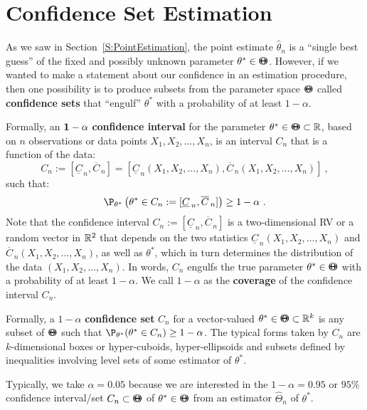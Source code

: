 \section{Confidence Set Estimation}\label{S:ConfidenceSets}
As we saw in Section~\ref*{S:PointEstimation}, the point estimate $\widehat{\theta}_n$ is a ``single best guess'' of  the fixed and possibly unknown parameter $\theta^* \in {\Theta}\mspace{-11 mu}{\Theta}$.  However, if we wanted to make a statement about our confidence in an estimation procedure, then one possibility is to produce subsets from the parameter space ${\Theta}\mspace{-11 mu}{\Theta}$ called {\bf confidence sets} that ``engulf'' $\theta^*$ with a probability of at least $1-\alpha$.  

Formally, an $\mathbf{1-\alpha}$ {\bf confidence interval} for the parameter $\theta^* \in {\Theta}\mspace{-11 mu}{\Theta} \subset \mathbb{R}$, based on $n$ observations or data points $X_1,X_2,\ldots,X_n$, is an interval $C_n$ that is a function of the data:
\[
C_n := [\underline{C}_{\, n}, \overline{C}_{\, n}]
= [\underline{C}_{\, n}(X_1,X_2,\ldots,X_n), \overline{C}_{\, n}(X_1,X_2,\ldots,X_n)] \ ,
\]
such that:
\[
\P_{\theta^*} \left(  \theta^* \in C_n :=  [\underline{C}_{\, n}, \overline{C}_{\, n}] \right) \geq 1-\alpha \ .
\]
Note that the confidence interval $C_n := [\underline{C}_{\, n}, \overline{C}_{\, n}]$ is a two-dimensional RV or a random vector in $\mathbb{R}^2$ that depends on the two statistics $\underline{C}_{\, n} (X_1,X_2,\ldots,X_n) $ and $\overline{C}_{\, n} (X_1,X_2,\ldots,X_n) $, as well as $\theta^*$, which in turn determines the distribution of the data $(X_1,X_2,\ldots,X_n)$.  In words, $C_n$ engulfs the true parameter $\theta^* \in {\Theta}\mspace{-11 mu}{\Theta}$ with a probability of at least $1-\alpha$.  We call $1-\alpha$ as the {\bf coverage} of the confidence interval $C_n$.

Formally, a $1-\alpha$ {\bf confidence set} $C_n$ for a vector-valued $\theta^* \in {\Theta}\mspace{-11 mu}{\Theta} \subset \mathbb{R}^k$ is any subset of ${\Theta}\mspace{-11 mu}{\Theta}$ such that $\P_{\theta^*}( \theta^* \in C_n) \geq 1-\alpha$.  The typical forms taken by $C_n$ are $k$-dimensional boxes or hyper-cuboids, hyper-ellipsoids and subsets defined by inequalities involving level sets of some estimator of $\theta^*$.  

Typically, we take $\alpha=0.05$ because we are interested in the $1-\alpha=0.95$ or $95\%$ confidence interval/set $C_n \subset {\Theta}\mspace{-11 mu}{\Theta}$ of $\theta^* \in {\Theta}\mspace{-11 mu}{\Theta}$ from an estimator $\widehat{\Theta}_n$ of $\theta^*$.  

